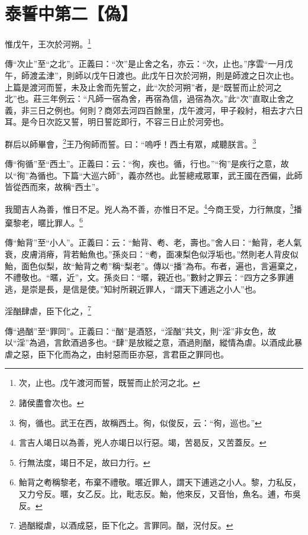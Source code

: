 \section{泰誓中第二【偽】}


惟戊午，王次於河朔。\footnote{次，止也。戊午渡河而誓，既誓而止於河之北。}

{\noindent\zhuan{}\fzbyks 傳“次止”至“之北”。正義曰：“次”是止舍之名，亦云：“次，止也。”序雲“一月戊午，師渡孟津”，則師以戊午日渡也。此戊午日次於河朔，則是師渡之日次止也。上篇是渡河而誓，未及止舍而先誓之，此“次於河朔”者，是“既誓而止於河之北”也。莊三年例云：“凡師一宿為舍，再宿為信，過宿為次。”此“次”直取止舍之義，非三日之例也。何則？商郊去河四百餘里，戊午渡河，甲子殺紂，相去才六日耳。是今日次訖又誓，明日誓訖即行，不容三日止於河旁也。 \par}

群后以師畢會，\footnote{諸侯盡會次也。}王乃徇師而誓。曰：“嗚呼！西土有眾，咸聽朕言。\footnote{徇，循也。武王在西，故稱西土。徇，似俊反，云：“徇，巡也。”}

{\noindent\zhuan{}\fzbyks 傳“徇循”至“西土”。正義曰：云：“徇，疾也。循，行也。”“徇”是疾行之意，故以“徇”為循也。下篇“大巡六師”，義亦然也。此誓總戒眾軍，武王國在西偏，此師皆從西而來，故稱“西土”。 \par}

我聞吉人為善，惟日不足。兇人為不善，亦惟日不足。\footnote{言吉人竭日以為善，兇人亦竭日以行惡。竭，苦曷反，又苦蓋反。}今商王受，力行無度，\footnote{行無法度，竭日不足，故曰力行。}播棄黎老，暱比罪人。\footnote{鮐背之耇稱黎老，布棄不禮敬。暱近罪人，謂天下逋逃之小人。黎，力私反，又力兮反。暱，女乙反。比，毗志反。鮐，他來反，又音怡，魚名。逋，布吳反。}

{\noindent\zhuan{}\fzbyks 傳“鮐背”至“小人”。正義曰：云：“鮐背、耇、老，壽也。”舍人曰：“鮐背，老人氣衰，皮膚消瘠，背若鮐魚也。”孫炎曰：“耇，面凍梨色似浮垢也。”然則老人背皮似鮐，面色似梨，故“鮐背之耇”稱“梨老”。傳以“播”為布。布者，遍也，言遍棄之，不禮敬也。“暱，近”，文。孫炎曰：“暱，親近也。”數紂之罪云：“四方之多罪逋逃，是崇是長，是信是使。”知紂所親近罪人，“謂天下逋逃之小人”也。 \par}

淫酗肆虐，臣下化之，\footnote{過酗縱虐，以酒成惡，臣下化之。言罪同。酗，況付反。}

{\noindent\zhuan{}\fzbyks 傳“過酗”至“罪同”。正義曰：“酗”是酒怒，“淫酗”共文，則“淫”非女色，故以“淫”為過，言飲酒過多也。“肆”是放縱之意，酒過則酗，縱情為虐。以酒成此暴虐之惡，臣下化而為之，由紂惡而臣亦惡，言君臣之罪同也。 \par}

